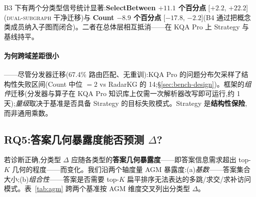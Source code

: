 \documentclass[11pt,a4paper]{article}
\newcommand{\op}[1]{\textsc{\small #1}}
\begin{document}
B3 下有两个分类型信号统计显著:\textbf{SelectBetween $+11.1$ 个百分点} [$+2.2$, $+22.2$](\op{dual-subgraph} 干净迁移)与 \textbf{Count $-8.9$ 个百分点} [$-17.8$, $-2.2$](B4 通过把概念类成员纳入子图而闭合)。二者在总体层相互抵消——在 KQA Pro 上 Strategy 与基线持平。

\paragraph{为何跨域差距很小}——尽管分发器迁移(67.4\% 路由匹配、无重训):KQA Pro 的问题分布欠采样了结构性失败区间(Count 中位 $=2$ vs RadarKG 的 14;\S\ref{sec:bench-design})。框架的\emph{组件}迁移(分发器与算子在 KQA Pro 知识库上仅需一次解析器改写即可运行,约 1 天);\emph{量级}取决于基准是否具备 Strategy 的目标失败模式。Strategy 是\textbf{结构性保险},而非通用乘数。

\subsection{RQ5:答案几何暴露度能否预测 \texorpdfstring{$\Delta$}{Delta}?}
\label{sec:rq5}

若诊断正确,分类型 $\Delta$ 应随各类型的\textbf{答案几何暴露度}——即答案信息需求超出 top-$K$ 几何的程度——而变化。我们沿两个轴度量 AGM 暴露度:(a)\emph{基数}——答案集合大小;(b)\emph{组合性}——答案是否需要 top-$K$ 扁平排序无法表达的多跳/求交/求补访问模式。表~\ref{tab:agm} 跨两个基准按 AGM 维度交叉列出分类型 $\Delta$。
\end{document}
